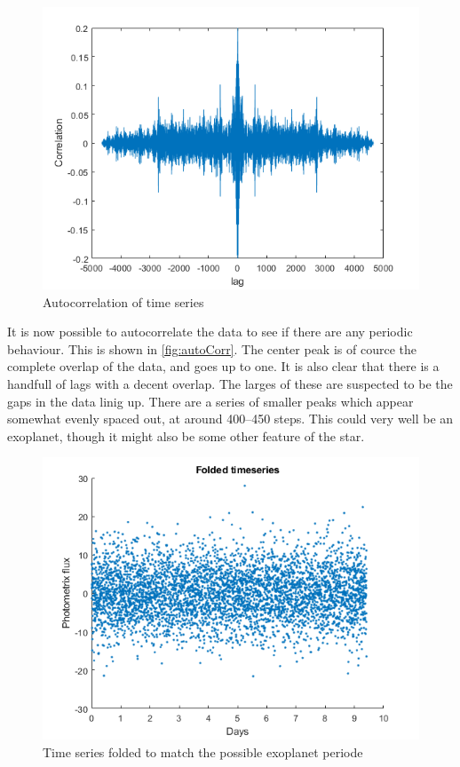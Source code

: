 \begin{figure}[h]
\centering
\includegraphics[width=\textwidth]{matlabstuff/Kepler_autoCorr.png}
\caption{Autocorrelation of time series}%
\label{fig:autoCorr}
\end{figure}

It is now possible to autocorrelate the data to see if there are any periodic behaviour. This is shown in \autoref{fig:autoCorr}. The center peak is of cource the complete overlap of the data, and goes up to one. It is also clear that there is a handfull of lags with a decent overlap. The larges of these are suspected to be the gaps in the data linig up. There are a series of smaller peaks which appear somewhat evenly spaced out, at around 400--450 steps. This could very well be an exoplanet, though it might also be some other feature of the star.

\begin{figure}[h]
\centering
\includegraphics[width=\textwidth]{matlabstuff/fold_data.png}
\caption{Time series folded to match the possible exoplanet periode}%
\label{fig:foldData}
\end{figure}

